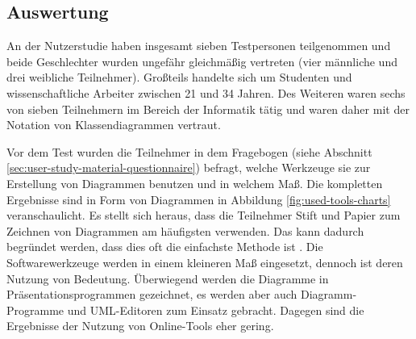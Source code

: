 \subsection{Auswertung}
\label{subsec:user-study-evaluation}

An der Nutzerstudie haben insgesamt sieben Testpersonen teilgenommen und beide Geschlechter wurden ungefähr gleichmäßig vertreten (vier männliche und drei weibliche Teilnehmer). Großteils handelte sich um Studenten und wissenschaftliche Arbeiter zwischen 21 und 34 Jahren. Des Weiteren waren sechs von sieben Teilnehmern im Bereich der Informatik tätig und waren daher mit der Notation von Klassendiagrammen vertraut.

Vor dem Test wurden die Teilnehmer in dem Fragebogen (siehe Abschnitt \ref{sec:user-study-material-questionnaire}) befragt, welche Werkzeuge sie zur Erstellung von Diagrammen benutzen und in welchem Maß. Die kompletten Ergebnisse sind in Form von Diagrammen in Abbildung \ref{fig:used-tools-charts} veranschaulicht. Es stellt sich heraus, dass die Teilnehmer Stift und Papier zum Zeichnen von Diagrammen am häufigsten verwenden. Das kann dadurch begründet werden, dass dies oft die einfachste Methode ist \cite{Ambler02Agile}. Die Softwarewerkzeuge werden in einem kleineren Maß eingesetzt, dennoch ist deren Nutzung von Bedeutung. Überwiegend werden die Diagramme in Präsentationsprogrammen gezeichnet, es werden aber auch Diagramm-Programme und UML-Editoren zum Einsatz gebracht. Dagegen sind die Ergebnisse der Nutzung von Online-Tools eher gering. 

